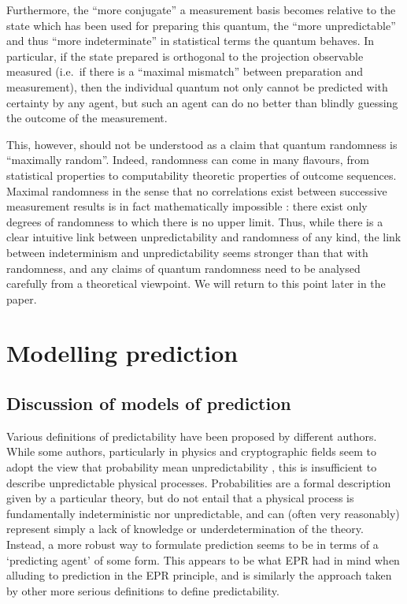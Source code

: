 \documentclass[%
 superscriptaddress,
 preprint,
 showpacs,
 showkeys,
 preprintnumbers,
  amsmath,amssymb,
  aps,
 pra,
  longbibliography,
  floatfix,
 ]{revtex4-1}
\theoremstyle{definition}
\begin{document}
Furthermore, the ``more conjugate'' a measurement basis becomes relative to the state which has been used for preparing this quantum, the ``more unpredictable'' and thus ``more indeterminate'' in statistical terms the quantum behaves.
In particular, if the state prepared is orthogonal to the projection observable measured
(i.e.\ if there is a ``maximal mismatch'' between preparation
and  measurement), then the individual quantum not only cannot be predicted with certainty by any agent, but such an agent can do no better than blindly guessing the outcome of the measurement.

This, however,  should not be understood as a claim that quantum randomness is ``maximally random''.
Indeed, randomness can come in many flavours, from statistical properties to computability theoretic properties of outcome sequences.
Maximal randomness in the sense that no correlations exist between successive measurement results is %
in fact mathematically impossible \cite{GS-90,calude:02}: there exist only degrees of randomness to which there is no upper limit.
Thus, while there is a clear intuitive link between unpredictability and randomness of any kind, the link between indeterminism and unpredictability seems stronger than that with randomness, and any claims of quantum randomness need to be analysed carefully from a theoretical viewpoint.
We will return to this point later in the paper.

\section{%
Modelling prediction}

\subsection{Discussion of models of prediction}

Various definitions of predictability have been proposed by different authors.
While some authors, particularly in physics and cryptographic fields seem to adopt the view that probability mean unpredictability \cite{Acin:2013qa,zeil-05_nature_ofQuantum}, this is insufficient to describe unpredictable physical processes.
Probabilities are a formal description given by a particular theory, but do not entail that a physical process is fundamentally indeterministic nor unpredictable, and can (often very reasonably) represent simply a lack of knowledge or underdetermination of the theory.
Instead, a more robust way to formulate prediction seems to be in terms of a `predicting agent' of some form.
This appears to be what EPR had in mind when alluding to prediction in the EPR principle, and is similarly the approach taken by other more serious definitions to define predictability.
\end{document}

